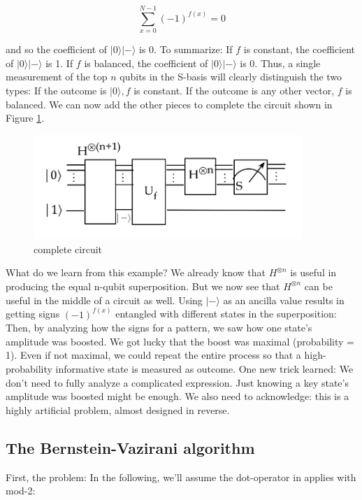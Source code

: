 \documentclass[main.tex]{subfiles}
\begin{document}
    $$
    \sum_{x=0}^{N-1}(-1)^{f(x)}=0
    $$
    
    and so the coefficient of $|0\rangle|-\rangle$ is 0. To summarize: If $f$ is constant, the coefficient of $|0\rangle|-\rangle$ is 1. If $f$ is balanced, the coefficient of $|0\rangle|-\rangle$ is 0. Thus, a single measurement of the top $n$ qubits in the S-basis will clearly distinguish the two types: If the outcome is $|0\rangle, f$ is constant. If the outcome is any other vector, $f$ is balanced. We can now add the other pieces to complete the circuit shown in Figure \ref{fig:18deutsch10}.
    
    
    \begin{figure}
        \centering
        \includegraphics[width=4in]{notes/figs/n11/18deutsch10.png}
            \caption{complete circuit}
        \label{fig:18deutsch10}
    \end{figure}
    
    What do we learn from this example? We already know that $H^{\otimes n}$ is useful in producing the equal n-qubit superposition. But we now see that $H^{\otimes n}$ can be useful in the middle of a circuit as well. Using $|-\rangle$ as an ancilla value results in getting signs $(-1)^{f(x)}$ entangled with different states in the superposition: Then, by analyzing how the signs for a pattern, we saw how one state's amplitude was boosted. We got lucky that the boost was maximal (probability = 1). Even if not maximal, we could repeat the entire process so that a high-probability informative state is measured as outcome. One new trick learned: We don't need to fully analyze a complicated expression. Just knowing a key state's amplitude was boosted might be enough. We also need to acknowledge: this is a highly artificial problem, almost designed in reverse.

\subsection{The Bernstein-Vazirani algorithm}

    First, the problem: In the following, we'll assume the dot-operator in applies with mod-2:
    
\end{document}
